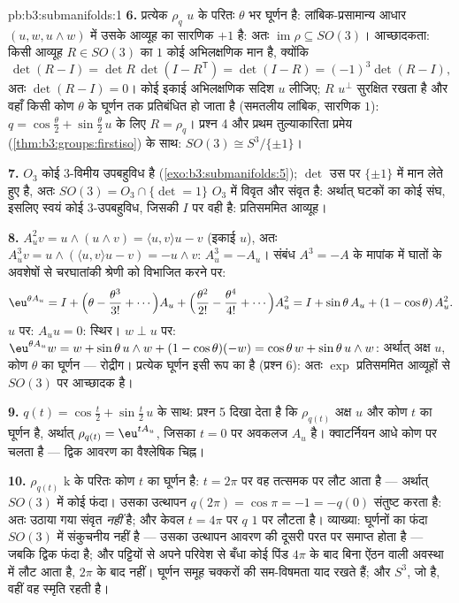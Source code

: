 \begin{solution}{pb:b3:submanifolds:1}
\textbf{6.} प्रत्येक $\rho_q$ $u$ के परितः $\theta$ भर घूर्णन है:
लांबिक-प्रसामान्य आधार $(u, w, u\wedge w)$ में उसके आव्यूह का सारणिक $+1$ है: अतः
$\operatorname{im}\rho \subseteq
SO(3)$। आच्छादकता: किसी आव्यूह $R \in SO(3)$ का $1$ कोई अभिलक्षणिक मान है,
क्योंकि
\[
\det(R - I) = \det R\,\det(I - R^{\mathsf T}) = \det(I - R)
= (-1)^3\det(R - I),
\]
अतः $\det(R - I) = 0$। कोई इकाई अभिलक्षणिक सदिश $u$ लीजिए; $R$ $u^\perp$ सुरक्षित
रखता है और वहाँ किसी कोण $\theta$ के घूर्णन तक प्रतिबंधित हो जाता है
(समतलीय लांबिक, सारणिक $1$): $q = \cos\frac\theta2 +
\sin\frac\theta2\,u$ के लिए $R = \rho_q$। प्रश्न 4 और प्रथम
तुल्याकारिता प्रमेय (\cref{thm:b3:groups:firstiso}) के साथ: $SO(3)
\cong S^3/\{\pm1\}$।

\textbf{7.} $O_3$ कोई  $3$-विमीय उपबहुविध है (\cref{exo:b3:submanifolds:5}); $\det$ उस
पर $\{\pm1\}$ में मान लेते हुए  है, अतः $SO(3) = O_3\cap\{\det = 1\}$ $O_3$ में विवृत और संवृत
है: अर्थात्  घटकों का कोई संघ, इसलिए स्वयं कोई  $3$-उपबहुविध,
जिसकी $I$ पर वही  है: प्रतिसममित आव्यूह।

\textbf{8.} $A_u^2v = u\wedge(u\wedge v) = \langle u,
v\rangle u - v$ (इकाई $u$), अतः $A_u^3v = u\wedge(\langle
u,v\rangle u - v) = -u\wedge v$: $A_u^3 = -A_u$। संबंध $A^3 = -A$ के
मापांक में घातों के अवशेषों से चरघातांकी श्रेणी को विभाजित करने पर:
\[
\eu^{\theta A_u} = I + \Bigl(\theta - \frac{\theta^3}{3!} +
\cdots\Bigr)A_u + \Bigl(\frac{\theta^2}{2!} -
\frac{\theta^4}{4!} + \cdots\Bigr)A_u^2
= I + \sin\theta\,A_u + (1 - \cos\theta)\,A_u^2 .
\]
$u$ पर: $A_uu = 0$: स्थिर। $w \perp u$ पर: $\eu^{\theta
A_u}w = w + \sin\theta\,u\wedge w + (1 - \cos\theta)(-w) =
\cos\theta\,w + \sin\theta\,u\wedge w$: अर्थात् अक्ष $u$, कोण
$\theta$ का घूर्णन --- रोद्रीग। प्रत्येक घूर्णन इसी रूप का है (प्रश्न
6): अतः $\exp$ प्रतिसममित आव्यूहों से $SO(3)$ पर आच्छादक है।

\textbf{9.} $q(t) = \cos\frac t2 + \sin\frac t2\,u$ के साथ: प्रश्न 5 दिखा देता है कि $\rho_{q(t)}$ अक्ष $u$
और कोण $t$ का घूर्णन है, अर्थात् $\rho_{q(t)} = \eu^{tA_u}$, जिसका $t = 0$ पर अवकलज $A_u$
है। क्वाटर्नियन आधे कोण पर चलता है --- द्विक आवरण का वैश्लेषिक चिह्न।

\textbf{10.} $\rho_{q(t)}$ $\mathrm k$ के परितः कोण $t$ का घूर्णन है: $t = 2\pi$ पर
वह तत्समक पर लौट आता है --- अर्थात् $SO(3)$ में कोई फंदा। उसका उत्थापन
$q(2\pi) = \cos\pi =
-1 = -q(0)$ संतुष्ट करता है: अतः उठाया गया  संवृत \emph{नहीं} है; और
केवल $t = 4\pi$ पर $q$ $1$ पर लौटता है। व्याख्या:  घूर्णनों का
फंदा $SO(3)$ में संकुचनीय नहीं है --- उसका उत्थापन आवरण की दूसरी परत
पर समाप्त होता है --- जबकि द्विक फंदा है; और पट्टियों से अपने परिवेश
से बँधा कोई पिंड $4\pi$ के बाद बिना ऐंठन वाली अवस्था में लौट आता है,
$2\pi$ के बाद नहीं। घूर्णन समूह  चक्करों की सम-विषमता याद रखते
हैं; और $S^3$, जो  है, वहीं वह स्मृति रहती है।


\end{solution}
